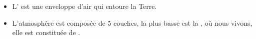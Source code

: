 \begin{mybilan}
	\begin{itemize}
		\item L' est une enveloppe d'air qui entoure la Terre.
		\item L'atmosphère est composée de 5 couches, la plus basse est la , où nous vivons, elle est constituée de . 
	\end{itemize}
	
\end{mybilan}